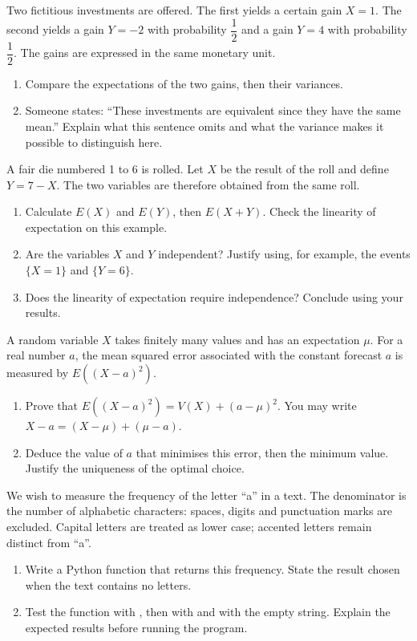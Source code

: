 
Two fictitious investments are offered. The first yields a certain gain $X=1$. The second yields a gain $Y=-2$ with probability $\dfrac12$ and a gain $Y=4$ with probability $\dfrac12$. The gains are expressed in the same monetary unit.
\begin{enumerate}[label=\arabic*.]
\item Compare the expectations of the two gains, then their variances.
\item Someone states: ``These investments are equivalent since they have the same mean.'' Explain what this sentence omits and what the variance makes it possible to distinguish here.
\end{enumerate}
A fair die numbered 1 to 6 is rolled. Let $X$ be the result of the roll and define $Y=7-X$. The two variables are therefore obtained from the same roll.
\begin{enumerate}[label=\arabic*.]
\item Calculate $E(X)$ and $E(Y)$, then $E(X+Y)$. Check the linearity of expectation on this example.
\item Are the variables $X$ and $Y$ independent? Justify using, for example, the events $\{X=1\}$ and $\{Y=6\}$.
\item Does the linearity of expectation require independence? Conclude using your results.
\end{enumerate}
A random variable $X$ takes finitely many values and has an expectation $\mu$. For a real number $a$, the mean squared error associated with the constant forecast $a$ is measured by $E((X-a)^2)$.
\begin{enumerate}[label=\arabic*.]
\item Prove that $E((X-a)^2)=V(X)+(a-\mu)^2$. You may write $X-a=(X-\mu)+(\mu-a)$.
\item Deduce the value of $a$ that minimises this error, then the minimum value. Justify the uniqueness of the optimal choice.
\end{enumerate}
We wish to measure the frequency of the letter ``a'' in a text. The denominator is the number of alphabetic characters: spaces, digits and punctuation marks are excluded. Capital letters are treated as lower case; accented letters remain distinct from ``a''.
\begin{enumerate}[label=\arabic*.]
\item Write a Python function that returns this frequency. State the result chosen when the text contains no letters.
\item Test the function with , then with  and with the empty string. Explain the expected results before running the program.
\end{enumerate}

